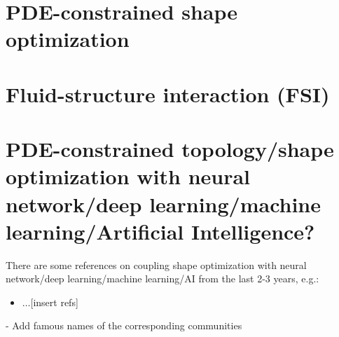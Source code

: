 \documentclass{book}
\numberwithin{equation}{section}
\begin{document}
\section{PDE-constrained shape optimization}

\section{Fluid-structure interaction (FSI)}

\section{PDE-constrained topology/shape optimization with neural network/deep learning/machine learning/Artificial Intelligence?}
There are some references on coupling shape optimization with neural network/deep learning/machine learning/AI from the last 2-3 years, e.g.:
\begin{itemize}
    \item $\ldots$[insert refs]
\end{itemize}



- Add famous names of the corresponding communities






\printbibliography[heading=bibintoc]
\end{document}
